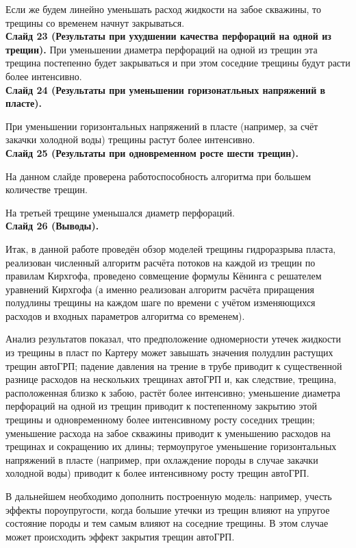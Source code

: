 \documentclass[a4paper, 12pt]{article}
\begin{document}
Если же будем линейно уменьшать расход жидкости на забое скважины, то трещины со временем начнут закрываться.
\\

\textbf{Слайд 23 (Результаты при ухудшении качества перфораций на одной из трещин).}
При уменьшении диаметра перфораций на одной из трещин эта трещина постепенно будет закрываться и при этом соседние трещины будут расти более интенсивно.
\\

\textbf{Слайд 24 (Результаты при уменьшении горизонатльных напряжений в пласте).}

При уменьшении горизонтальных напряжений в пласте (например, за счёт закачки холодной воды) трещины растут более интенсивно.
\\

\textbf{Слайд 25 (Результаты при одновременном росте шести трещин).}

На данном слайде проверена работоспособность алгоритма при большем количестве трещин.

На третьей трещине уменьшался диаметр перфораций.
\\

\textbf{Слайд 26 (Выводы).}


Итак, в данной работе проведён обзор моделей трещины гидроразрыва пласта, реализован численный алгоритм расчёта потоков на каждой из трещин по правилам Кирхгофа, проведено совмещение формулы Кёнинга с решателем уравнений Кирхгофа (а именно реализован алгоритм расчёта приращения полудлины трещины на каждом шаге по времени с учётом изменяющихся расходов и входных параметров алгоритма со временем).

Анализ результатов показал, что предположение одномерности утечек жидкости из трещины в пласт по Картеру может завышать значения полудлин растущих трещин автоГРП; падение давления на трение в трубе приводит к существенной разнице расходов на нескольких трещинах автоГРП и, как следствие, трещина, расположенная близко к забою, растёт более интенсивно; уменьшение диаметра перфораций на одной из трещин приводит к постепенному закрытию этой трещины и одновременному более интенсивному росту соседних трещин; уменьшение расхода на забое скважины приводит к уменьшению расходов на трещинах и сокращению их длины; термоупругое уменьшение горизонтальных напряжений в пласте (например, при охлаждение породы в случае закачки холодной воды) приводит к более интенсивному росту трещин автоГРП.

В дальнейшем необходимо дополнить построенную модель: например, учесть эффекты пороупругости, когда большие утечки из трещин влияют на упругое состояние породы и тем самым влияют на соседние трещины.
В этом случае может происходить эффект закрытия трещин автоГРП.
\end{document}
